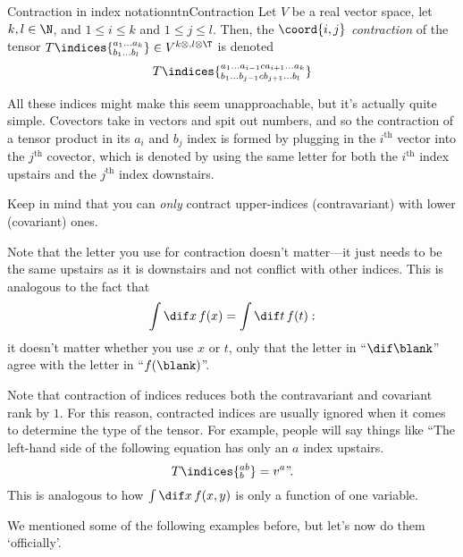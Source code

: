 \begin{ntn}{Contraction in index notation}{ntnContraction}
Let $V$ be a real vector space, let $k,l\in \N$, and $1\leq i\leq k$ and $1\leq j\leq l$.  Then, the $\coord{i,j}$ \emph{contraction} of the tensor $T\indices{^{a_1\ldots a_k}_{b_1\ldots b_l}}\in V^{k\otimes ,l\otimes \T}$ is denoted
\begin{equation}
T\indices{^{a_1\ldots a_{i-1}ca_{i+1}\ldots a_k}_{b_1\ldots b_{j-1}cb_{j+1}\ldots b_l}}
\end{equation}
\begin{rmk}
	All these indices might make this seem unapproachable, but it's actually quite simple.  Covectors take in vectors and spit out numbers, and so the contraction of a tensor product in its $a_i$ and $b_j$ index is formed by plugging in the $i^{\text{th}}$ vector into the $j^{\text{th}}$ covector, which is denoted by using the same letter for both the $i^{\text{th}}$ index upstairs and the $j^{\text{th}}$ index downstairs.
\end{rmk}
\begin{rmk}
	Keep in mind that you can \emph{only} contract upper-indices (contravariant) with lower (covariant) ones.
\end{rmk}	
\begin{rmk}
	Note that the letter you use for contraction doesn't matter---it just needs to be the same upstairs as it is downstairs and not conflict with other indices.  This is analogous to the fact that
	\begin{equation}
	\int \dif x\, f(x)=\int \dif t\, f(t):
	\end{equation}
	it doesn't matter whether you use $x$ or $t$, only that the letter in ``$\dif \blank$'' agree with the letter in ``$f(\blank )$''.
\end{rmk}
\begin{rmk}
	Note that contraction of indices reduces both the contravariant and covariant rank by $1$.  For this reason, contracted indices are usually ignored when it comes to determine the type of the tensor.  For example, people will say things like ``The left-hand side of the following equation has only an $a$ index upstairs.
	\begin{equation}
	T\indices{^{ab}_b}=v^a\text{''.}
	\end{equation}
	This is analogous to how $\int \dif x\, f(x,y)$ is only a function of one variable.
\end{rmk}
\end{ntn}
We mentioned some of the following examples before, but let's now do them `officially'.

